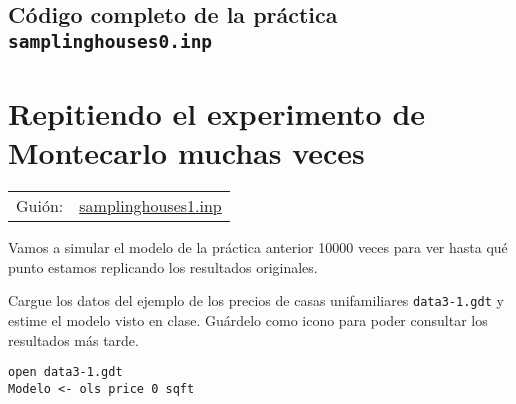 \documentclass[11pt]{article}
\begin{document}
\clearpage
\vspace{10pt}
\noindent
\subsection{Código completo de la práctica \texttt{samplinghouses0.inp}}
\label{sec:orgbe7c5d2}
\vspace{10pt}

\clearpage



\section{Repitiendo el experimento de Montecarlo muchas veces}
\label{sec:orgbfa6a45}

\begin{center}
\begin{tabular}{ll}
Guión: & \href{https://github.com/mbujosab/Ectr/tree/master/Practicas/Gretl/scripts/samplinghouses1.inp}{samplinghouses1.inp}\\[0pt]
\end{tabular}
\end{center}

Vamos a simular el modelo de la práctica anterior 10000 veces para ver
hasta qué punto estamos replicando los resultados originales.

Cargue los datos del ejemplo de los precios de casas unifamiliares
\texttt{data3-1.gdt} y estime el modelo visto en clase. Guárdelo como icono
para poder consultar los resultados más tarde.

\begin{verbatim}
open data3-1.gdt
Modelo <- ols price 0 sqft
\end{verbatim}
\end{document}
